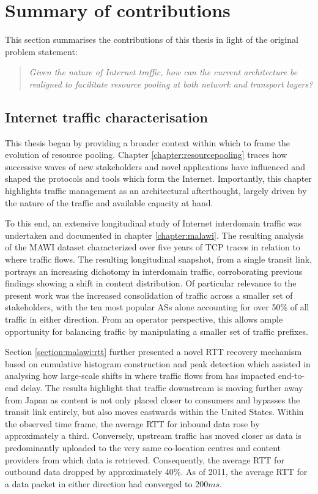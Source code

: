\section{Summary of contributions}

This section summarises the contributions of this thesis in light of the original problem statement:

\begin{quote}
\textit{
Given the nature of Internet traffic, how can the current architecture be realigned to facilitate resource pooling at both network and transport layers?
}
\end{quote}

\subsection{Internet traffic characterisation}

This thesis began by providing a broader context within which to frame the evolution of resource pooling.
Chapter \ref{chapter:resourcepooling} traces how successive waves of new stakeholders and novel applications have influenced and shaped the protocols and tools which form the Internet.
Importantly, this chapter highlights traffic management as an architectural afterthought, largely driven by the nature of the traffic and available capacity at hand.

To this end, an extensive longitudinal study of Internet interdomain traffic was undertaken and documented in chapter \ref{chapter:malawi}.
The resulting analysis of the \ac{MAWI} dataset characterized over five years of TCP traces in relation to where traffic flows. 
The resulting longitudinal snapshot, from a single transit link, portrays an increasing dichotomy in interdomain traffic, corroborating previous findings \cite{Labovitz:2010p175} showing a shift in content distribution.
Of particular relevance to the present work was the increased consolidation of traffic across a smaller set of stakeholders, with the ten most popular \acp{AS} alone accounting for over 50\% of all traffic in either direction.
From an operator perspective, this allows ample opportunity for balancing traffic by manipulating a smaller set of traffic prefixes.

Section \ref{section:malawi:rtt} further presented a novel \ac{RTT} recovery mechanism based on cumulative histogram construction and peak detection which assisted in analysing how large-scale shifts in where traffic flows from has impacted end-to-end delay.
The results highlight that traffic downstream is moving further away from Japan as content is not only placed closer to consumers and bypasses the transit link entirely, but also moves eastwards within the United States.
Within the observed time frame, the average \ac{RTT} for inbound data rose by approximately a third.
Conversely, upstream traffic has moved closer as data is predominantly uploaded to the very same co-location centres and content providers from which data is retrieved.
Consequently, the average \ac{RTT} for outbound data dropped by approximately 40\%.
As of 2011, the average \ac{RTT} for a data packet in either direction had converged to 200$ms$.

